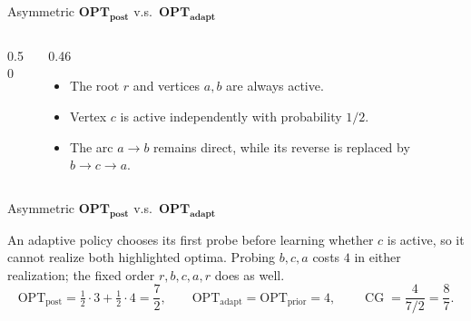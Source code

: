 \documentclass[aspectratio=169,12pt]{beamer}
\newcommand{\OPT}{\mathrm{OPT}}
\newcommand{\optpost}{\OPT_{\mathrm{post}}}
\newcommand{\optadapt}{\OPT_{\mathrm{adapt}}}
\newcommand{\optprior}{\OPT_{\mathrm{prior}}}
\begin{document}
\begin{frame}{Asymmetric \(\mathbf{OPT}_{\mathbf{post}}\) v.s.\ \(\mathbf{OPT}_{\mathbf{adapt}}\)}
  \begin{columns}[c,onlytextwidth]
    \begin{column}{0.50\textwidth}
      \centering
      \resizebox{0.82\linewidth}{!}{\ThAsymFourVertexSeed}
    \end{column}
    \begin{column}{0.46\textwidth}
      \begin{itemize}\setlength{\itemsep}{0.64em}
        \item The root \(r\) and vertices \(a,b\) are always active.
        \item Vertex \(c\) is active independently with probability \(1/2\).
        \item The arc \(a\to b\) remains direct, while its reverse is
          replaced by \(b\to c\to a\).
      \end{itemize}
    \end{column}
  \end{columns}
\end{frame}

\begin{frame}{Asymmetric \(\mathbf{OPT}_{\mathbf{post}}\) v.s.\ \(\mathbf{OPT}_{\mathbf{adapt}}\)}
  \centering
  {\small\bfseries
    \par}
  \smallskip
  \resizebox{0.76\linewidth}{!}{\ThAsymFourVertexOutcomes}

  \vspace{0.10cm}
  \small
  An adaptive policy chooses its first probe before learning whether \(c\) is
  active, so it cannot realize both highlighted optima. Probing \(b,c,a\) costs
  \(4\) in either realization; the fixed order \(r,b,c,a,r\) does as well.
  \[
    \optpost=\tfrac12\cdot3+\tfrac12\cdot4=\frac72,\qquad
    \optadapt=\optprior=4,\qquad
    \operatorname{CG}=\frac{4}{7/2}=\frac87.
  \]
\end{frame}
\end{document}
